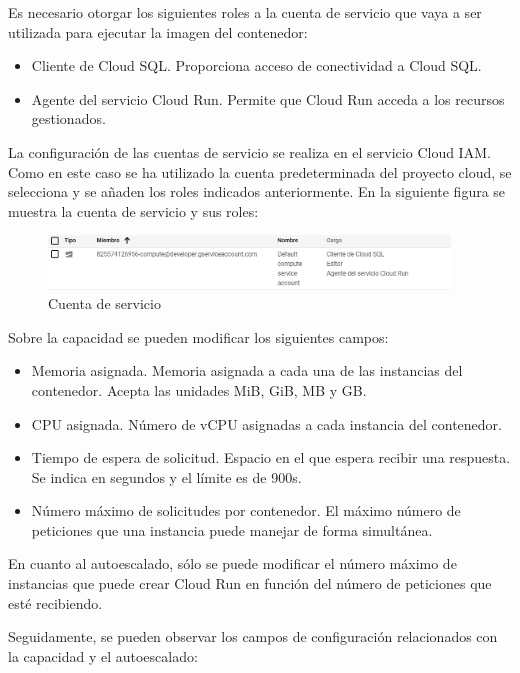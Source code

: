 Es necesario otorgar los siguientes roles a la cuenta de servicio que vaya a ser utilizada para ejecutar la imagen del contenedor:
\begin{itemize}
    \item Cliente de Cloud SQL. Proporciona acceso de conectividad a Cloud SQL.
    \item Agente del servicio Cloud Run. Permite que Cloud Run acceda a los recursos gestionados.
\end{itemize}

La configuración de las cuentas de servicio se realiza en el servicio Cloud IAM. Como en este caso se ha utilizado la cuenta predeterminada del proyecto cloud, se selecciona y se añaden los roles indicados anteriormente. En la siguiente figura se muestra la cuenta de servicio y sus roles:

\begin{figure}[ht]
    	\begin{center}
    		\includegraphics[width = 0.95\textwidth]{Figuras/rolesCloudIAM.PNG}
    	\end{center}
    	\caption{\label{fig:IAM} Cuenta de servicio}
\end{figure}

Sobre la capacidad se pueden modificar los siguientes campos:
\begin{itemize}
    \item Memoria asignada. Memoria asignada a cada una de las instancias del contenedor. Acepta las unidades MiB, GiB, MB y GB.
    \item CPU asignada. Número de vCPU asignadas a cada instancia del contenedor.
    \item Tiempo de espera de solicitud. Espacio en el que espera recibir una respuesta. Se indica en segundos y el límite es de 900s.
    \item Número máximo de solicitudes por contenedor. El máximo número de peticiones que una instancia puede manejar de forma simultánea.
\end{itemize}

En cuanto al autoescalado, sólo se puede modificar el número máximo de instancias que puede crear Cloud Run en función del número de peticiones que esté recibiendo.

Seguidamente, se pueden observar los campos de configuración relacionados con la capacidad y el autoescalado:

